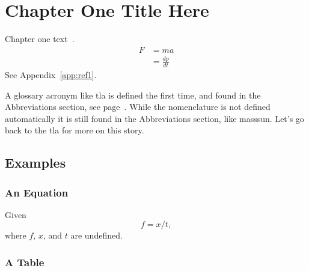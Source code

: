 \chapter{Chapter One Title Here} \label{chap:ref1}

Chapter one text~\cite{article1,book1}. 
\begin{align}
  F &= m a \\
    &= \frac{dp}{dt} \label{eq:ref1}
\end{align}
See Appendix~\ref{app:ref1}.


%
A glossary acronym like \gls{tla} is defined the first time, and found in the Abbreviations section, see page~\pageref{sec:abbrevs}. While the nomenclature is not defined automatically it is still found in the Abbreviations section, like \gls{masssun}. Let's go back to the \gls{tla} for more on this story.


\section{Examples}

\subsection{An Equation}
Given
\begin{equation}  \label{eq:ex}
   f  = x / t ,
\end{equation}
where $f$, $x$, and $t$ are undefined.

\subsection{A Table}


